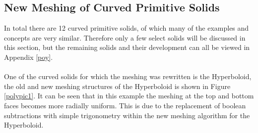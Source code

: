 \documentclass[12pt,a4paper]{article}
\begin{document}
\subsection{New Meshing of Curved Primitive Solids}
In total there are 12 curved primitive solids, of which many of the examples and concepts are very similar. Therefore only a few select solids will be discussed in this section, but the remaining solids and their development can all be viewed in Appendix \ref{poy}.
\\\\
One of the curved solids for which the meshing was rewritten is the Hyperboloid, the old and new meshing structures of the Hyperboloid is shown in Figure \ref{polypic1}. It can be seen that in this example the meshing at the top and bottom faces becomes more radially uniform. This is due to the replacement of boolean subtractions with simple trigonometry within the new meshing algorithm for the Hyperboloid.
\\\\
\end{document}
